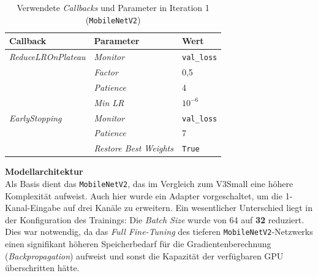 \documentclass[
    a4paper,        %
    11pt,           %
    ngerman,        %
    parskip=half,   %
    listof=totoc,   %
    bibliography=totoc %
]{scrartcl}
\begin{document}
\begin{table}[H]
    \centering
    \caption{Verwendete \textit{Callbacks} und Parameter in Iteration 1 (\texttt{MobileNetV2})}
    \label{tab:mnetv2_callbacks_iter1}
    \begin{tabular}{lll}
        \toprule
        \textbf{Callback} & \textbf{Parameter} & \textbf{Wert} \\
        \midrule
        \textit{ReduceLROnPlateau} & \textit{Monitor} & \texttt{val\_loss} \\
                          & \textit{Factor} & 0,5 \\
                          & \textit{Patience} & 4 \\
                          & \textit{Min LR} & $10^{-6}$ \\
        \midrule
        \textit{EarlyStopping}     & \textit{Monitor} & \texttt{val\_loss} \\
                          & \textit{Patience} & 7 \\
                          & \textit{Restore Best Weights} & \texttt{True} \\
        \bottomrule
    \end{tabular}
\end{table}

\textbf{Modellarchitektur} \\
Als Basis dient das \texttt{MobileNetV2}, das im Vergleich zum V3Small eine höhere Komplexität aufweist. Auch hier wurde ein Adapter vorgeschaltet, um die 1-Kanal-Eingabe auf drei Kanäle zu erweitern. Ein wesentlicher Unterschied liegt in der Konfiguration des Trainings: Die \textit{Batch Size} wurde von 64 auf \textbf{32} reduziert. Dies war notwendig, da das \textit{Full Fine-Tuning} des tieferen \texttt{MobileNetV2}-Netzwerks einen signifikant höheren Speicherbedarf für die Gradientenberechnung (\textit{Backpropagation}) aufweist und sonst die Kapazität der verfügbaren GPU überschritten hätte.
\end{document}
